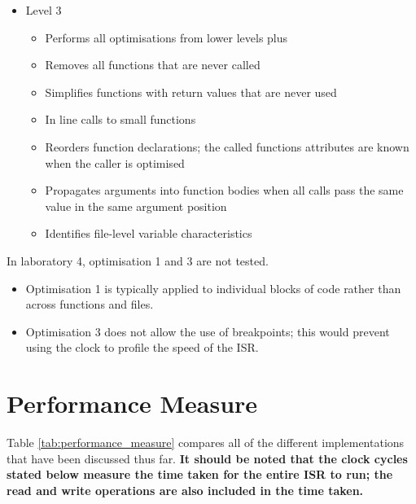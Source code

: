 \documentclass{article}
\begin{document}
\begin{itemize}
\begin{itemize}
    \end{itemize}
    \item Level 3
    \begin{itemize}
        \item Performs all optimisations from lower levels plus
        \item Removes all functions that are never called
        \item Simplifies functions with return values that are never used
        \item In line calls to small functions
        \item Reorders function declarations; the called functions attributes are known when the caller is optimised
        \item Propagates arguments into function bodies when all calls pass the same value in the same argument position
        \item Identifies file-level variable characteristics
    \end{itemize}
\end{itemize}

In laboratory 4, optimisation 1 and 3 are not tested. 
\begin{itemize}
    \item Optimisation 1 is typically applied to individual blocks of code rather than across functions and files.
    \item Optimisation 3 does not allow the use of breakpoints; this would prevent using the clock to profile the speed of the ISR.
\end{itemize} 


\section{Performance Measure}
Table \ref{tab:performance_measure} compares all of the different implementations that have been discussed thus far. \textbf{It should be noted that the clock cycles stated below measure the time taken for the entire ISR to run; the read and write operations are also included in the time taken.}
\end{document}

